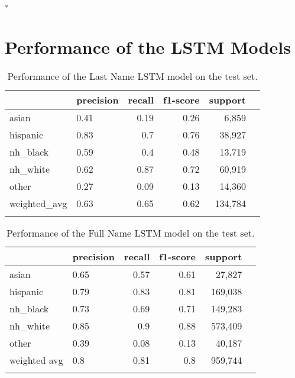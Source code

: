 \documentclass[12pt, letterpaper]{article}
\begin{document}
\singlespacing
\textsuperscript{*} 
\doublespacing

\clearpage
\section{Performance of the LSTM Models}\label{lstm_perf}

\begin{table}[h!]
\centering
\caption{Performance of the Last Name LSTM model on the test set.}
\begin{tabular}{llrrrr}
\hline
          & precision   &    recall &   f1-score &   support \\
\hline
 asian    & 0.41        &      0.19 &       0.26 &   6,859    \\
 hispanic & 0.83        &      0.7  &       0.76 &  38,927    \\
 nh\_black & 0.59        &      0.4  &       0.48 &  13,719    \\
 nh\_white & 0.62        &      0.87 &       0.72 &  60,919    \\
 other    & 0.27        &      0.09 &       0.13 &  14,360    \\
 weighted\_avg   &      0.63 &       0.65 & 0.62 & 134,784\\
\hline
\label{table:lstm_last_name}
\end{tabular}
\end{table}

\begin{table}[h!]
\centering
\caption{Performance of the Full Name LSTM model on the test set.}
\begin{tabular}{llrrrr}
\hline
          & precision   &    recall &   f1-score &   support \\
\hline
 asian    & 0.65        &      0.57 &       0.61 &  27,827    \\
 hispanic & 0.79        &      0.83 &       0.81 & 169,038    \\
 nh\_black & 0.73        &      0.69 &       0.71 & 149,283    \\
 nh\_white & 0.85        &      0.9  &       0.88 & 573,409    \\
 other    & 0.39        &      0.08 &       0.13 &  40,187    \\
 weighted avg       &   0.8  &       0.81 &      0.8 & 959,744 \\
\hline
\label{table:lstm_full_name}
\end{tabular}
\end{table}
\end{document}
